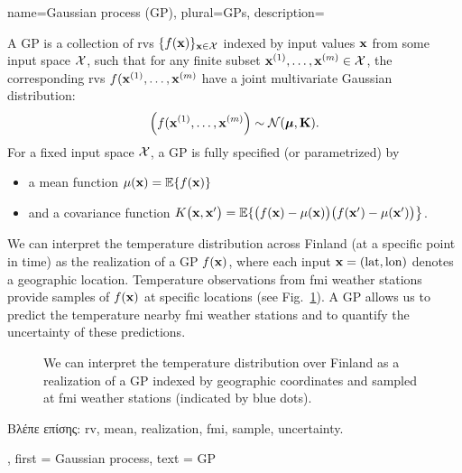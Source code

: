 {name={Gaussian process (GP)}, plural={GPs},
  description={A GP is a collection of \gls{rv}s 
  	$\{f({\bf x})\}_{{\bf x} \in \mathcal{X}}$ indexed by input values ${\bf x}$ 
  	from some input space $\mathcal{X}$, such that for any finite subset 
  	${\bf x}^{(1)}, \ldots, {\bf x}^{(m)} \in \mathcal{X}$, 
  	the corresponding \gls{rv}s $f({\bf x}^{(1)}, \ldots, {\bf x}^{(m)}$ have a joint 
  	multivariate Gaussian distribution:
  	\[
  	\left( f({\bf x}^{(1)}, \ldots, {\bf x}^{(m)} \right) \sim \mathcal{N}(\boldsymbol{\mu}, \mathbf{K}).
  	\]
  	For a fixed input space $\mathcal{X}$, a GP is fully specified (or parametrized) by 
  	\begin{itemize}
  		\item a \gls{mean} function $\mu({\bf x}) = \mathbb{E}\{ f({\bf x})\}$
  		\item and a covariance function $K\big({\bf x},{\bf x}'\big)= \mathbb{E}\{ \big(f({\bf x})-\mu({\bf x})\big) \big(f({\bf x}')-\mu({\bf x}')\big) \big\}$.
  	\end{itemize}
  	 We can interpret the temperature distribution across Finland (at a specific 
  	point in time) as the \gls{realization} of a GP $f({\bf x})$, where each input ${\bf x} = (\text{lat}, \text{lon})$ 
  	denotes a geographic location. Temperature observations from \gls{fmi} weather stations provide 
  	\gls{sample}s of $f({\bf x})$ at specific locations (see Fig.\ \ref{fig_gp_FMI}). A GP allows us to 
  	predict the temperature nearby \gls{fmi} weather stations and to quantify the \gls{uncertainty} 
  	of these predictions. 
  	\begin{figure}[H]
  	\begin{center}
\vspace*{-15mm}
\end{center}
\caption{We can interpret the temperature distribution over Finland as a \gls{realization} 
	of a GP indexed by geographic coordinates and sampled at \gls{fmi} weather stations (indicated by 
	blue dots). \label{fig_gp_FMI}}
\end{figure}
\foreignlanguage{greek}{Βλέπε επίσης:} \gls{rv}, \gls{mean}, \gls{realization}, \gls{fmi}, \gls{sample}, \gls{uncertainty}. }, 
first = {Gaussian process}, 
text = {GP}
}

